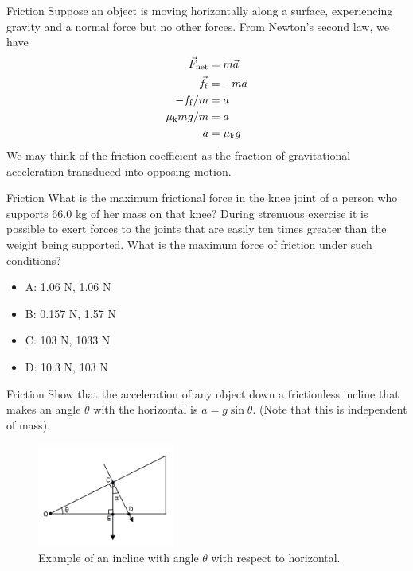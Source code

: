 \documentclass{beamer}
\begin{document}
\begin{frame}{Friction}
Suppose an object is moving horizontally along a surface, experiencing gravity and a normal force but no other forces.  From Newton's second law, we have \\
\begin{align}
\vec{F}_{\rm net} &= m \vec{a} \\
\vec{f}_{\rm f} &= -m\vec{a} \\
-f_{\rm f}/m &= a \\
\mu_{\rm k} m g / m &= a \\
a &= \mu_{\rm k} g
\end{align}
We may think of the friction coefficient as the fraction of gravitational acceleration transduced into opposing motion.
\end{frame}

\begin{frame}{Friction}
What is the maximum frictional force in the knee joint of a person who supports 66.0 kg of her mass on that knee?  During strenuous exercise it is possible to exert forces to the joints that are easily ten times greater than the weight being supported. What is the maximum force of friction under such conditions?
\begin{itemize}
\item A: 1.06 N, 1.06 N
\item B: 0.157 N, 1.57 N
\item C: 103 N, 1033 N
\item D: 10.3 N, 103 N
\end{itemize}
\end{frame}

\begin{frame}{Friction}
Show that the acceleration of any object down a frictionless incline that makes an angle $\theta$ with the horizontal is $a = g\sin\theta$.  (Note that this is independent of mass).
\begin{figure}
\centering
\includegraphics[width=0.4\textwidth]{figures/incline.png}
\caption{\label{fig:incline} Example of an incline with angle $\theta$ with respect to horizontal.}
\end{figure}
\end{frame}
\end{document}
